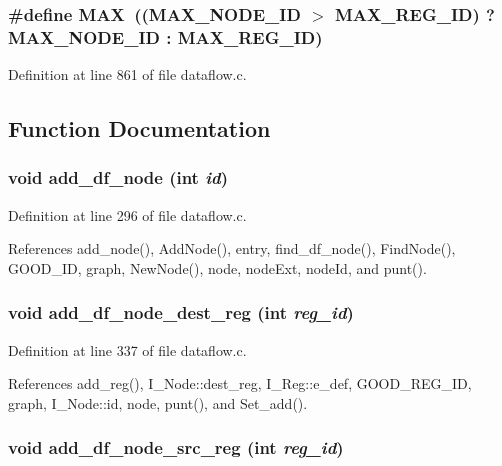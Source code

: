 \subsubsection{\setlength{\rightskip}{0pt plus 5cm}\#define MAX~((MAX\_\-NODE\_\-ID $>$ MAX\_\-REG\_\-ID) ? MAX\_\-NODE\_\-ID : MAX\_\-REG\_\-ID)}\label{dataflow_8c_392fb874e547e582e9c66a08a1f23326}




Definition at line 861 of file dataflow.c.

\subsection{Function Documentation}
\subsubsection{\setlength{\rightskip}{0pt plus 5cm}void add\_\-df\_\-node (int {\em id})}\label{dataflow_8c_7f405d5c7c371a55362c8389ed9c4b05}




Definition at line 296 of file dataflow.c.

References add\_\-node(), Add\-Node(), entry, find\_\-df\_\-node(), Find\-Node(), GOOD\_\-ID, graph, New\-Node(), node, node\-Ext, node\-Id, and punt().
\subsubsection{\setlength{\rightskip}{0pt plus 5cm}void add\_\-df\_\-node\_\-dest\_\-reg (int {\em reg\_\-id})}\label{dataflow_8c_f182228aef8e2118a879f42eeb3d7c1d}




Definition at line 337 of file dataflow.c.

References add\_\-reg(), I\_\-Node::dest\_\-reg, I\_\-Reg::e\_\-def, GOOD\_\-REG\_\-ID, graph, I\_\-Node::id, node, punt(), and Set\_\-add().
\subsubsection{\setlength{\rightskip}{0pt plus 5cm}void add\_\-df\_\-node\_\-src\_\-reg (int {\em reg\_\-id})}\label{dataflow_8c_90bb36d257114197da5da7233cce012c}




